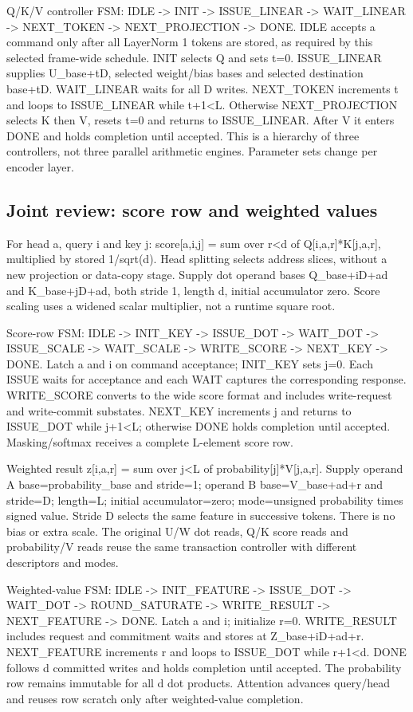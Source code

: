 \documentclass[11pt,a4paper]{article}
\begin{document}
Q/K/V controller FSM: IDLE -> INIT -> ISSUE\_LINEAR -> WAIT\_LINEAR -> NEXT\_TOKEN -> NEXT\_PROJECTION -> DONE. IDLE accepts a command only after all LayerNorm 1 tokens are stored, as required by this selected frame-wide schedule. INIT selects Q and sets t=0. ISSUE\_LINEAR supplies U\_base+tD, selected weight/bias bases and selected destination base+tD. WAIT\_LINEAR waits for all D writes. NEXT\_TOKEN increments t and loops to ISSUE\_LINEAR while t+1<L. Otherwise NEXT\_PROJECTION selects K then V, resets t=0 and returns to ISSUE\_LINEAR. After V it enters DONE and holds completion until accepted. This is a hierarchy of three controllers, not three parallel arithmetic engines. Parameter sets change per encoder layer.

\subsection{Joint review: score row and weighted values}

For head a, query i and key j: score[a,i,j] = sum over r<d of Q[i,a,r]*K[j,a,r], multiplied by stored 1/sqrt(d). Head splitting selects address slices, without a new projection or data-copy stage. Supply dot operand bases Q\_base+iD+ad and K\_base+jD+ad, both stride 1, length d, initial accumulator zero. Score scaling uses a widened scalar multiplier, not a runtime square root.

Score-row FSM: IDLE -> INIT\_KEY -> ISSUE\_DOT -> WAIT\_DOT -> ISSUE\_SCALE -> WAIT\_SCALE -> WRITE\_SCORE -> NEXT\_KEY -> DONE. Latch a and i on command acceptance; INIT\_KEY sets j=0. Each ISSUE waits for acceptance and each WAIT captures the corresponding response. WRITE\_SCORE converts to the wide score format and includes write-request and write-commit substates. NEXT\_KEY increments j and returns to ISSUE\_DOT while j+1<L; otherwise DONE holds completion until accepted. Masking/softmax receives a complete L-element score row.

Weighted result z[i,a,r] = sum over j<L of probability[j]*V[j,a,r]. Supply operand A base=probability\_base and stride=1; operand B base=V\_base+ad+r and stride=D; length=L; initial accumulator=zero; mode=unsigned probability times signed value. Stride D selects the same feature in successive tokens. There is no bias or extra scale. The original U/W dot reads, Q/K score reads and probability/V reads reuse the same transaction controller with different descriptors and modes.

Weighted-value FSM: IDLE -> INIT\_FEATURE -> ISSUE\_DOT -> WAIT\_DOT -> ROUND\_SATURATE -> WRITE\_RESULT -> NEXT\_FEATURE -> DONE. Latch a and i; initialize r=0. WRITE\_RESULT includes request and commitment waits and stores at Z\_base+iD+ad+r. NEXT\_FEATURE increments r and loops to ISSUE\_DOT while r+1<d. DONE follows d committed writes and holds completion until accepted. The probability row remains immutable for all d dot products. Attention advances query/head and reuses row scratch only after weighted-value completion.
\end{document}
